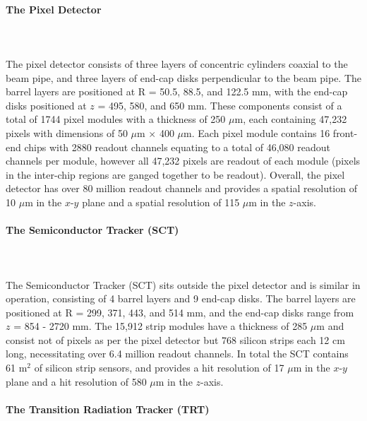 \documentclass[12pt,a4paper,epsf,portrait,times,epsfig]{article}
\begin{document}
		\paragraph{The Pixel Detector}\label{Section:PixelDetector}
		\mbox{}\\
		\mbox{} \\

		The pixel detector consists of three layers of concentric cylinders coaxial to the beam pipe, and three layers of end-cap disks perpendicular to the beam pipe. The barrel layers are positioned at R = 50.5, 88.5, and 122.5 mm, with the end-cap disks positioned at $z$ = 495, 580, and 650 mm. These components consist of a total of 1744 pixel modules \cite{ATLASPixel} with a thickness of 250 $\mu$m, each containing 47,232 pixels with dimensions of 50 $\mu$m $\times$ 400 $\mu$m. Each pixel module contains 16 front-end chips with 2880 readout channels equating to a total of 46,080 readout channels per module, however all 47,232 pixels are readout of each module (pixels in the inter-chip regions are ganged together to be readout). Overall, the pixel detector has over 80 million readout channels and provides a spatial resolution of 10 $\mu$m in the $x$-$y$ plane and a spatial resolution of 115 $\mu$m in the $z$-axis. 


		\paragraph{The Semiconductor Tracker (SCT)}\label{Section:SCT}
		\mbox{}\\
		\mbox{} \\

		The Semiconductor Tracker (SCT) \cite{ATLASSCT} sits outside the pixel detector and is similar in operation, consisting of 4 barrel layers and 9 end-cap disks. The barrel layers are positioned at R = 299, 371, 443, and 514 mm, and the end-cap disks range from $z$ = 854 - 2720 mm. The 15,912 strip modules have a thickness of 285 $\mu$m and consist not of pixels as per the pixel detector but 768 silicon strips each 12 cm long, necessitating over 6.4 million readout channels. In total the SCT contains 61 m$^{2}$ of silicon strip sensors, and provides a hit resolution of 17 $\mu$m in the $x$-$y$ plane and a hit resolution of 580 $\mu$m in the $z$-axis. 

		\paragraph{The Transition Radiation Tracker (TRT)}\label{Section:TRT} 
		\mbox{}\\
		\mbox{} \\
\end{document}
